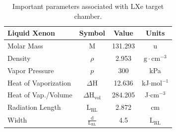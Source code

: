 \documentclass[%
reprint,
nofootinbib,
amsmath, amssymb,
aps,
floatfix,
]{revtex4-2}
\begin{document}
\begin{table}[H]
    \centering
    \begin{tabular}{lccc}
        \hline \hline
        \textbf{Liquid Xenon} & \textbf{Symbol} & \textbf{Value} & \textbf{Units} \\
        \hline
        Molar Mass & M & 131.293 & u \\
        Density & $\rho$ & 2.953 & $\textrm{g} \cdot \textrm{cm}^{-3}$ \\
        Vapor Pressure & $p$ & 300 & kPa \\
        Heat of Vaporization & $\Delta \textrm{H}$ & 12.636 & kJ$\cdot$mol$^{-1}$ \\
        Heat of Vap./Volume & $\Delta \textrm{H}_{\textrm{vol}}$ & 284.205 & J$\cdot \textrm{cm}^{-3}$ \\
        Radiation Length & $\textrm{L}_{\textrm{RL}}$ & 2.872 & cm \\
        Width & $\frac{\textrm{d}}{\textrm{L}_{\textrm{RL}}}$ & 4.5 & $\textrm{L}_{\textrm{RL}}$ \\
        \hline \hline
    \end{tabular}
    \caption{\label{tab:XeInfo}Important parameters associated with LXe target chamber.}
\end{table}
\end{document}
